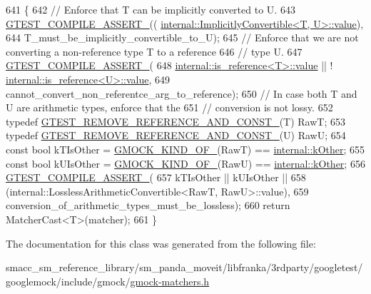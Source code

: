 \begin{DoxyCode}
641                                                            \{
642     \textcolor{comment}{// Enforce that T can be implicitly converted to U.}
643     \hyperlink{gtest-port_8h_ae1f37dc71d5daa6fb49ca1b6047d4a8c}{GTEST\_COMPILE\_ASSERT\_}((
      \hyperlink{classtesting_1_1internal_1_1ImplicitlyConvertible_aea51cecabca681fb75659e224771b7b7}{internal::ImplicitlyConvertible<T, U>::value}),
644                           T\_must\_be\_implicitly\_convertible\_to\_U);
645     \textcolor{comment}{// Enforce that we are not converting a non-reference type T to a reference}
646     \textcolor{comment}{// type U.}
647     \hyperlink{gtest-port_8h_ae1f37dc71d5daa6fb49ca1b6047d4a8c}{GTEST\_COMPILE\_ASSERT\_}(
648         \hyperlink{structtesting_1_1internal_1_1bool__constant_a499fba6576296b04d99690a486424b32}{internal::is\_reference<T>::value} || !
      \hyperlink{structtesting_1_1internal_1_1bool__constant_a499fba6576296b04d99690a486424b32}{internal::is\_reference<U>::value},
649         cannot\_convert\_non\_referentce\_arg\_to\_reference);
650     \textcolor{comment}{// In case both T and U are arithmetic types, enforce that the}
651     \textcolor{comment}{// conversion is not lossy.}
652     \textcolor{keyword}{typedef} \hyperlink{gtest-internal_8h_a874567b176266188fabfffb8393267ce}{GTEST\_REMOVE\_REFERENCE\_AND\_CONST\_}(T) RawT;
653     \textcolor{keyword}{typedef} \hyperlink{gtest-internal_8h_a874567b176266188fabfffb8393267ce}{GTEST\_REMOVE\_REFERENCE\_AND\_CONST\_}(U) RawU;
654     \textcolor{keyword}{const} \textcolor{keywordtype}{bool} kTIsOther = \hyperlink{gmock-internal-utils_8h_a72b01bdd08b78e927270885ca880ead4}{GMOCK\_KIND\_OF\_}(RawT) == 
      \hyperlink{namespacetesting_1_1internal_aa8747bda20137c9aa7f846dee830e686ad47f29150ab7a9ec8ce2491f44537347}{internal::kOther};
655     \textcolor{keyword}{const} \textcolor{keywordtype}{bool} kUIsOther = \hyperlink{gmock-internal-utils_8h_a72b01bdd08b78e927270885ca880ead4}{GMOCK\_KIND\_OF\_}(RawU) == 
      \hyperlink{namespacetesting_1_1internal_aa8747bda20137c9aa7f846dee830e686ad47f29150ab7a9ec8ce2491f44537347}{internal::kOther};
656     \hyperlink{gtest-port_8h_ae1f37dc71d5daa6fb49ca1b6047d4a8c}{GTEST\_COMPILE\_ASSERT\_}(
657         kTIsOther || kUIsOther ||
658         (internal::LosslessArithmeticConvertible<RawT, RawU>::value),
659         conversion\_of\_arithmetic\_types\_must\_be\_lossless);
660     \textcolor{keywordflow}{return} MatcherCast<T>(matcher);
661   \}
\end{DoxyCode}


The documentation for this class was generated from the following file\+:\begin{DoxyCompactItemize}
\item 
smacc\+\_\+sm\+\_\+reference\+\_\+library/sm\+\_\+panda\+\_\+moveit/libfranka/3rdparty/googletest/googlemock/include/gmock/\hyperlink{gmock-matchers_8h}{gmock-\/matchers.\+h}\end{DoxyCompactItemize}

